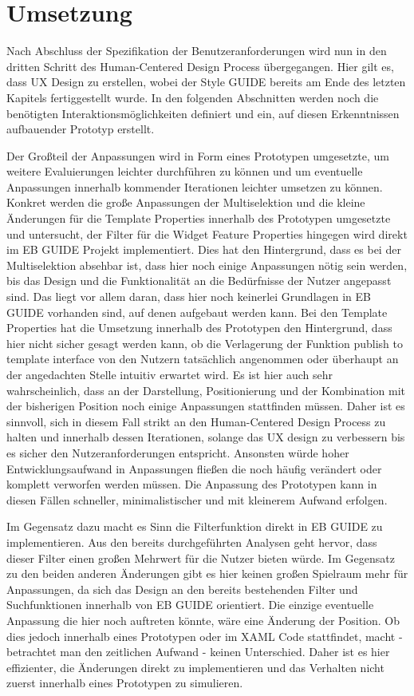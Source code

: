 \chapter{Umsetzung}\label{ch:experiments}

Nach Abschluss der Spezifikation der Benutzeranforderungen wird nun in den dritten Schritt des Human-Centered Design Process übergegangen.
Hier gilt es, dass UX Design zu erstellen, wobei der Style GUIDE bereits am Ende des letzten Kapitels fertiggestellt wurde.
In den folgenden Abschnitten werden noch die benötigten Interaktionsmöglichkeiten definiert und ein, auf diesen Erkenntnissen aufbauender Prototyp erstellt.

Der Großteil der Anpassungen wird in Form eines Prototypen umgesetzte, um weitere Evaluierungen leichter durchführen zu können und um eventuelle Anpassungen innerhalb kommender Iterationen leichter umsetzen zu können.
Konkret werden die große Anpassungen der Multiselektion und die kleine Änderungen für die Template Properties innerhalb des Prototypen umgesetzte und untersucht, der Filter für die Widget Feature Properties hingegen wird direkt im EB GUIDE Projekt implementiert.
Dies hat den Hintergrund, dass es bei der Multiselektion absehbar ist, dass hier noch einige Anpassungen nötig sein werden, bis das Design und die Funktionalität an die Bedürfnisse der Nutzer angepasst sind.
Das liegt vor allem daran, dass hier noch keinerlei Grundlagen in EB GUIDE vorhanden sind, auf denen aufgebaut werden kann.
Bei den Template Properties hat die Umsetzung innerhalb des Prototypen den Hintergrund, dass hier nicht sicher gesagt werden kann, ob die Verlagerung der Funktion \glqq publish to template interface\grqq{} von den Nutzern tatsächlich angenommen oder überhaupt an der angedachten Stelle intuitiv erwartet wird.
Es ist hier auch sehr wahrscheinlich, dass an der Darstellung, Positionierung und der Kombination mit der bisherigen Position noch einige Anpassungen stattfinden müssen.
Daher ist es sinnvoll, sich in diesem Fall strikt an den Human-Centered Design Process zu halten und innerhalb dessen Iterationen, solange das UX design zu verbessern bis es sicher den Nutzeranforderungen entspricht.
Ansonsten würde hoher Entwicklungsaufwand in Anpassungen fließen die noch häufig verändert oder komplett verworfen werden müssen.
Die Anpassung des Prototypen kann in diesen Fällen schneller, minimalistischer und mit kleinerem Aufwand erfolgen.

Im Gegensatz dazu macht es Sinn die Filterfunktion direkt in EB GUIDE zu implementieren.
Aus den bereits durchgeführten Analysen geht hervor, dass dieser Filter einen großen Mehrwert für die Nutzer bieten würde.
Im Gegensatz zu den beiden anderen Änderungen gibt es hier keinen großen Spielraum mehr für Anpassungen, da sich das Design an den bereits bestehenden Filter und Suchfunktionen innerhalb von EB GUIDE orientiert.
Die einzige eventuelle Anpassung die hier noch auftreten könnte, wäre eine Änderung der Position.
Ob dies jedoch innerhalb eines Prototypen oder im XAML Code stattfindet, macht - betrachtet man den zeitlichen Aufwand - keinen Unterschied.
Daher ist es hier effizienter, die Änderungen direkt zu implementieren und das Verhalten nicht zuerst innerhalb eines Prototypen zu simulieren.

